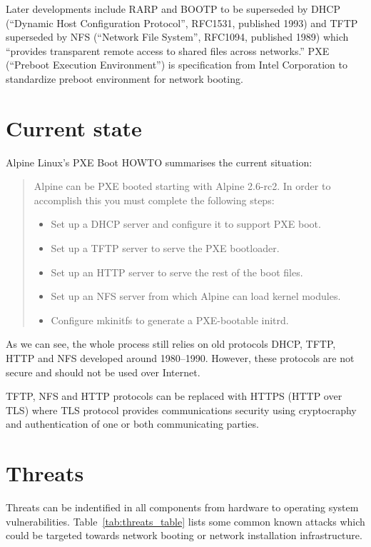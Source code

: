 Later developments include RARP and BOOTP to be superseded by DHCP
(``Dynamic Host Configuration Protocol'', RFC1531, published
1993\cite{RFC1531}) and TFTP superseded by NFS (``Network File
System'', RFC1094, published 1989\cite{RFC1094}) which ``provides
transparent remote access to shared files across
networks.''\cite{RFC1094} PXE (``Preboot Execution
Environment''\cite{PXEspec}) is specification from Intel Corporation
to standardize preboot environment for network booting.


\section{Current state}

Alpine Linux's PXE Boot HOWTO\cite{alpine-pxe-boot-howto} summarises
the current situation:

\begin{quote}
Alpine can be PXE booted starting with Alpine 2.6-rc2. In order to
accomplish this you must complete the following steps:

\begin{itemize}
\item Set up a DHCP server and configure it to support PXE boot.
\item Set up a TFTP server to serve the PXE bootloader.
\item Set up an HTTP server to serve the rest of the boot files.
\item Set up an NFS server from which Alpine can load kernel modules.
\item Configure mkinitfs to generate a PXE-bootable initrd.
\end{itemize}
\end{quote}

As we can see, the whole process still relies on old protocols DHCP,
TFTP, HTTP and NFS developed around 1980--1990. However, these
protocols are not secure and should not be used over Internet.

TFTP, NFS and HTTP protocols can be replaced with HTTPS (HTTP over
TLS) where TLS protocol provides communications security using
cryptocraphy and authentication of one or both communicating parties.


\section{Threats}

Threats can be indentified in all components from hardware to
operating system vulnerabilities. Table~\ref{tab:threats_table} lists
some common known attacks which could be targeted towards network
booting or network installation infrastructure.

